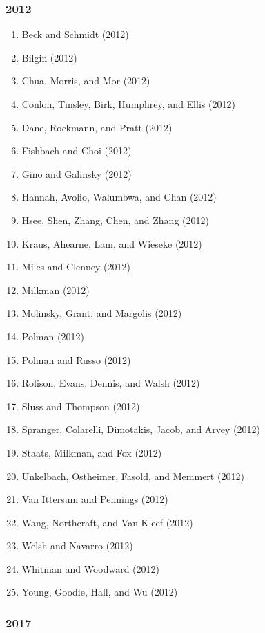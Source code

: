 \documentclass[english,man]{apa6}
\providecommand{\tightlist}{%
  \setlength{\itemsep}{0pt}\setlength{\parskip}{0pt}}
\begin{document}
\subsubsection{2012}\label{section-28}

\begin{enumerate}
\def\labelenumi{\arabic{enumi})}
\tightlist
\item
  Beck and Schmidt (2012)
\item
  Bilgin (2012)
\item
  Chua, Morris, and Mor (2012)
\item
  Conlon, Tinsley, Birk, Humphrey, and Ellis (2012)
\item
  Dane, Rockmann, and Pratt (2012)
\item
  Fishbach and Choi (2012)
\item
  Gino and Galinsky (2012)
\item
  Hannah, Avolio, Walumbwa, and Chan (2012)
\item
  Hsee, Shen, Zhang, Chen, and Zhang (2012)
\item
  Kraus, Ahearne, Lam, and Wieseke (2012)
\item
  Miles and Clenney (2012)
\item
  Milkman (2012)
\item
  Molinsky, Grant, and Margolis (2012)
\item
  Polman (2012)
\item
  Polman and Russo (2012)
\item
  Rolison, Evans, Dennis, and Walsh (2012)
\item
  Sluss and Thompson (2012)
\item
  Spranger, Colarelli, Dimotakis, Jacob, and Arvey (2012)
\item
  Staats, Milkman, and Fox (2012)
\item
  Unkelbach, Ostheimer, Fasold, and Memmert (2012)
\item
  Van Ittersum and Pennings (2012)
\item
  Wang, Northcraft, and Van Kleef (2012)
\item
  Welsh and Navarro (2012)
\item
  Whitman and Woodward (2012)
\item
  Young, Goodie, Hall, and Wu (2012)
\end{enumerate}

\subsubsection{2017}\label{section-29}
\end{document}
